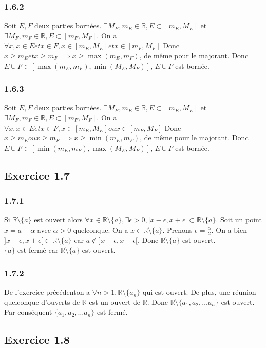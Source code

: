 \documentclass[]{book}
\theoremstyle{definition}
\newcommand{\bb}[1]{\mathbb{#1}}
\newcommand{\R}{\bb{R}}
\begin{document}
\subsubsection*{1.6.2}
Soit $E, F$ deux parties born\'ees. $\exists M_E,m_E \in \R, E \subset [m_E,M_E]$ et $\exists M_F,m_F \in \R, E \subset [m_F,M_F]$. On a $\forall x, x \in E et x \in F, x \in [m_E, M_E] et x \in [m_F, M_F]$ Donc $x \geq m_E et x \geq m_F \implies x \geq \max(m_E, m_F)$, de m\^eme pour le majorant. Donc $E \cup F \in [\max(m_E,m_F), \min(M_E, M_F)]$, $E \cup F$ est born\'ee.

\subsubsection*{1.6.3}
Soit $E, F$ deux parties born\'ees. $\exists M_E,m_E \in \R, E \subset [m_E,M_E]$ et $\exists M_F,m_F \in \R, E \subset [m_F,M_F]$. On a $\forall x, x \in E et x \in F, x \in [m_E, M_E] ou x \in [m_F, M_F]$ Donc $x \geq m_E ou x \geq m_F \implies x \geq \min(m_E, m_F)$, de m\^eme pour le majorant. Donc $E \cup F \in [\min(m_E,m_F), \max(M_E, M_F)]$, $E \cup F$ est born\'ee.

\subsection*{Exercice 1.7}
\subsubsection*{1.7.1}
Si $\R \setminus \{a\}$ est ouvert alors $\forall x \in \R \setminus \{a\}, \exists \epsilon > 0, ]x-\epsilon, x+\epsilon[ \subset \R \setminus \{a\}$. Soit un point $x=a+\alpha$ avec $\alpha>0$ quelconque. On a $x \in \R \setminus \{a\}$. Prenons $\epsilon = \frac{\alpha}{2}$. On a bien $]x-\epsilon, x+\epsilon[ \subset \R \setminus \{a\}$ car $a \notin ]x-\epsilon, x+\epsilon[$. Donc $\R \setminus \{a\}$ est ouvert. \\
$\{a\}$ est ferm\'e car $\R \setminus \{a\}$ est ouvert.
\subsubsection*{1.7.2}
De l'exercice pr\'ec\'edenton a $\forall n >1, \R \setminus \{a_n\}$ qui est ouvert. De plus, une r\'eunion quelconque d’ouverts de $\R$ est un ouvert de $\R$. Donc 
$\R \setminus \{a_1, a_2, \ldots a_n\}$ est ouvert. Par cons\'equent $\{a_1, a_2, \ldots a_n\}$ est ferm\'e.

\subsection*{Exercice 1.8}
\end{document}
